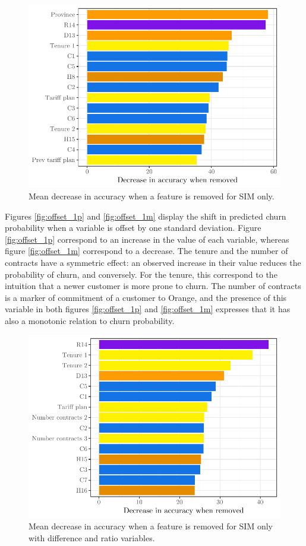 \begin{figure}
    \centering
    \includegraphics[width=0.9\linewidth]{figures/var_imp_simo_decrease_accuracy.pdf}
    \caption{Mean decrease in accuracy when a feature is removed for SIM only.}
    \label{fig:var_imp_simo_decrease_accuracy}
\end{figure}


Figures \ref{fig:offset_1p} and \ref{fig:offset_1m} display the shift in
predicted churn probability when a variable is offset by one standard deviation.
Figure \ref{fig:offset_1p} correspond to an increase in the value of each
variable, whereas figure \ref{fig:offset_1m} correspond to a decrease. The
tenure and the number of contracts have a symmetric effect: an observed increase
in their value reduces the probability of churn, and conversely. For the tenure,
this correspond to the intuition that a newer customer is more prone to churn.
The number of contracts is a marker of commitment of a customer to Orange, and
the presence of this variable in both figures \ref{fig:offset_1p} and
\ref{fig:offset_1m} expresses that it has also a monotonic relation to churn
probability.


\begin{figure}
    \centering
    \includegraphics[width=0.9\linewidth]{figures/var_imp_simo_diff_decrease_accuracy.pdf}
    \caption{Mean decrease in accuracy when a feature is removed for SIM only
    with difference and ratio variables.}
    \label{fig:var_imp_simo_diff_decrease_accuracy}
\end{figure}


